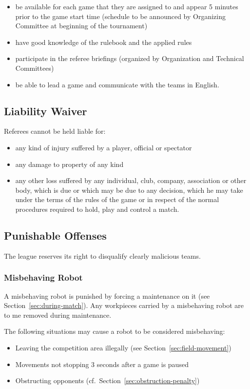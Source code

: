\documentclass[12pt,twoside]{article}
\newcommand{\refsec}[1]{Section~\ref{#1}}
\begin{document}
\begin{itemize}
\item be available for each game that they are assigned to and appear
  5 minutes prior to the game start time (schedule to be announced by
  Organizing Committee at beginning of the tournament)
\item have good knowledge of the rulebook and the applied rules
\item participate in the referee briefings (organized by Organization
  and Technical Committees)
\item be able to lead a game and communicate with the teams in
  English.
\end{itemize}

\subsection{Liability Waiver}
Referees cannot be held liable for:
\begin{itemize}
\item any kind of injury suffered by a player, official or spectator
\item any damage to property of any kind
\item any other loss suffered by any individual, club, company,
  association or other body, which is due or which may be due to any
  decision, which he may take under the terms of the rules of the game
  or in respect of the normal procedures required to hold, play and
  control a match.
\end{itemize}

\subsection{Punishable Offenses}
The league reserves its right to disqualify clearly malicious teams.

\subsubsection{Misbehaving Robot}
\label{sec:misbehaving-robot}
A misbehaving robot is punished by forcing a maintenance on it (see
\refsec{sec:during-match}).
Any workpieces carried by a misbehaving robot are to me removed during
maintenance.

The following situations may cause a robot to be considered misbehaving:
\begin{itemize}
  \item Leaving the competition area illegally (see \refsec{sec:field-movement})
  \item Movements not stopping 3 seconds after a game is paused
  \item Obstructing opponents (cf.~\refsec{sec:obstruction-penalty})
\end{itemize}
\end{document}
